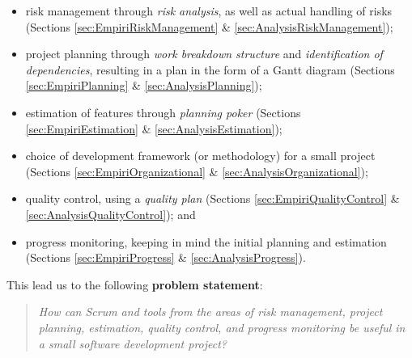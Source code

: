 \begin{itemize} \item risk management through \emph{risk analysis}, as well as
		actual handling of risks (Sections
	\ref{sec:EmpiriRiskManagement} \& \ref{sec:AnalysisRiskManagement});
	\item project planning through \emph{work breakdown structure} and
		\emph{identification of dependencies}, resulting in a plan in
	the form of a Gantt diagram (Sections \ref{sec:EmpiriPlanning} \&
	\ref{sec:AnalysisPlanning}); \item estimation of features through
		\emph{planning poker} (Sections \ref{sec:EmpiriEstimation} \&
		\ref{sec:AnalysisEstimation}); \item choice of development
		framework (or methodology) for a small project (Sections
	\ref{sec:EmpiriOrganizational} \& \ref{sec:AnalysisOrganizational});
	\item quality control, using a \emph{quality plan} (Sections
		\ref{sec:EmpiriQualityControl} \&
		\ref{sec:AnalysisQualityControl}); and \item progress
	monitoring, keeping in mind the initial planning and estimation
	(Sections \ref{sec:EmpiriProgress} \& \ref{sec:AnalysisProgress}).
\end{itemize}

This lead us to the following \textbf{problem statement}:
\begin{quote}
\emph{
How can Scrum and tools from the areas of risk management, project planning, estimation, quality control, and
progress monitoring be useful in a small software development project?
}
\end{quote}
